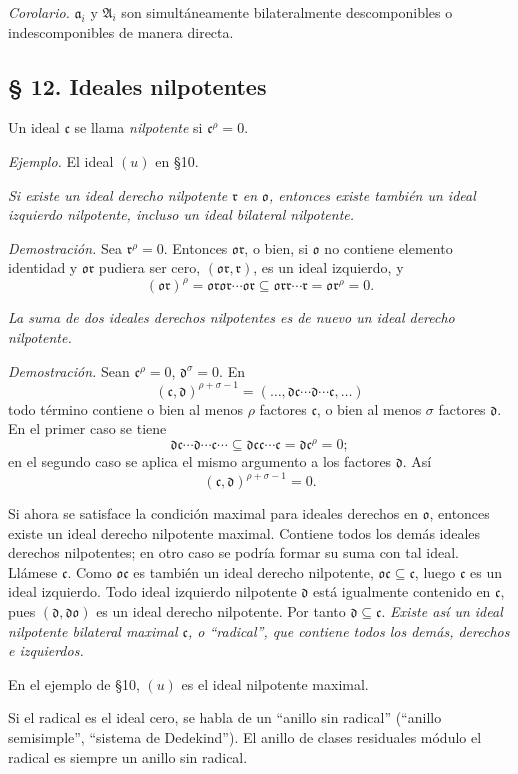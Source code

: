\documentclass[11pt]{article}
\providecommand{\mA}{\mathfrak{A}}
\providecommand{\mo}{\mathfrak{o}}
\providecommand{\ma}{\mathfrak{a}}
\providecommand{\mc}{\mathfrak{c}}
\providecommand{\md}{\mathfrak{d}}
\providecommand{\mr}{\mathfrak{r}}
\begin{document}
\emph{Corolario.} $\ma_i$ y $\mA_i$ son simultáneamente bilateralmente descomponibles o indescomponibles de manera directa.

\subsection*{§ 12. Ideales nilpotentes}

Un ideal $\mc$ se llama \emph{nilpotente} si $\mc^\rho=0$.

\emph{Ejemplo.} El ideal $(u)$ en §10.

\emph{Si existe un ideal derecho nilpotente $\mr$ en $\mo$, entonces existe también un ideal izquierdo nilpotente, incluso un ideal bilateral nilpotente.}

\emph{Demostración.} Sea $\mr^\rho=0$. Entonces $\mo\mr$, o bien, si $\mo$ no contiene elemento identidad y $\mo\mr$ pudiera ser cero, $(\mo\mr,\mr)$, es un ideal izquierdo, y
\[
        (\mo\mr)^\rho=\mo\mr\mo\mr\cdots\mo\mr\subseteq\mo\mr\mr\cdots\mr=\mo\mr^\rho=0.
\]

\emph{La suma de dos ideales derechos nilpotentes es de nuevo un ideal derecho nilpotente.}

\emph{Demostración.} Sean $\mc^\rho=0$, $\md^\sigma=0$. En
\[
        (\mc,\md)^{\rho+\sigma-1}=(\ldots,\md\mc\cdots\md\cdots\mc,\ldots)
\]
todo término contiene o bien al menos $\rho$ factores $\mc$, o bien al menos $\sigma$ factores $\md$. En el primer caso se tiene
\[
        \md\mc\cdots\md\cdots\mc\cdots\subseteq\md\mc\mc\cdots\mc=\md\mc^\rho=0;
\]
en el segundo caso se aplica el mismo argumento a los factores $\md$. Así
\[
        (\mc,\md)^{\rho+\sigma-1}=0.
\]

Si ahora se satisface la condición maximal para ideales derechos en $\mo$, entonces existe un ideal derecho nilpotente maximal. Contiene todos los demás ideales derechos nilpotentes; en otro caso se podría formar su suma con tal ideal. Llámese $\mc$. Como $\mo\mc$ es también un ideal derecho nilpotente, $\mo\mc\subseteq\mc$, luego $\mc$ es un ideal izquierdo. Todo ideal izquierdo nilpotente $\md$ está igualmente contenido en $\mc$, pues $(\md,\md\mo)$ es un ideal derecho nilpotente. Por tanto $\md\subseteq\mc$. \emph{Existe así un ideal nilpotente bilateral maximal $\mc$, o ``radical'', que contiene todos los demás, derechos e izquierdos.}

En el ejemplo de §10, $(u)$ es el ideal nilpotente maximal.

Si el radical es el ideal cero, se habla de un ``anillo sin radical'' (``anillo semisimple'', ``sistema de Dedekind''). El anillo de clases residuales módulo el radical es siempre un anillo sin radical.
\end{document}
